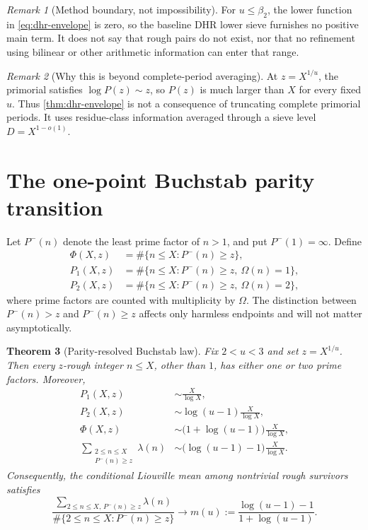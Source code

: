 \documentclass[11pt]{article}
\newtheorem{theorem}{Theorem}[section]
\theoremstyle{definition}
\theoremstyle{remark}
\newtheorem{remark}[theorem]{Remark}
\newcommand{\Om}{\Omega}
\begin{document}
\begin{remark}[Method boundary, not impossibility]\label{rem:dhr-boundary}
For $u\le\beta_2$, the lower function in \eqref{eq:dhr-envelope} is zero, so the baseline DHR lower sieve furnishes no positive main term.  It does not say that rough pairs do not exist, nor that no refinement using bilinear or other arithmetic information can enter that range.
\end{remark}

\begin{remark}[Why this is beyond complete-period averaging]\label{rem:polynomial-beyond-period}
At $z=X^{1/u}$, the primorial satisfies $\log P(z)\sim z$, so $P(z)$ is much larger than $X$ for every fixed $u$.  Thus \cref{thm:dhr-envelope} is not a consequence of truncating complete primorial periods.  It uses residue-class information averaged through a sieve level $D=X^{1-o(1)}$.
\end{remark}

\section{The one-point Buchstab parity transition}\label{sec:buchstab}

Let $P^-(n)$ denote the least prime factor of $n>1$, and put $P^-(1)=\infty$.  Define
\begin{align}
 \Phi(X,z)&=\#\{n\le X:P^-(n)\ge z\},\label{eq:phi-rough}\\
 P_1(X,z)&=\#\{n\le X:P^-(n)\ge z,\ \Om(n)=1\},\label{eq:p1-count}\\
 P_2(X,z)&=\#\{n\le X:P^-(n)\ge z,\ \Om(n)=2\},\label{eq:p2-count}
\end{align}
where prime factors are counted with multiplicity by $\Om$.  The distinction between $P^-(n)>z$ and $P^-(n)\ge z$ affects only harmless endpoints and will not matter asymptotically.

\begin{theorem}[Parity-resolved Buchstab law]\label{thm:buchstab-parity}
Fix $2<u<3$ and set $z=X^{1/u}$.  Then every $z$-rough integer $n\le X$, other than $1$, has either one or two prime factors.  Moreover,
\begin{align}
 P_1(X,z)&\sim\frac{X}{\log X},\label{eq:p1-asymptotic}\\
 P_2(X,z)&\sim\log(u-1)\frac{X}{\log X},\label{eq:p2-asymptotic}\\
 \Phi(X,z)&\sim\bigl(1+\log(u-1)\bigr)\frac{X}{\log X},\label{eq:phi-asymptotic}\\
 \sum_{\substack{2\le n\le X\\P^-(n)\ge z}}\lambda(n)
 &\sim\bigl(\log(u-1)-1\bigr)\frac{X}{\log X}.
 \label{eq:liouville-rough-asymptotic}
\end{align}
Consequently, the conditional Liouville mean among nontrivial rough survivors satisfies
\begin{equation}\label{eq:conditional-parity-bias}
 \frac{\sum_{2\le n\le X,\,P^-(n)\ge z}\lambda(n)}
      {\#\{2\le n\le X:P^-(n)\ge z\}}
 \longrightarrow
 m(u):=\frac{\log(u-1)-1}{1+\log(u-1)}.
\end{equation}
\end{theorem}
\end{document}
